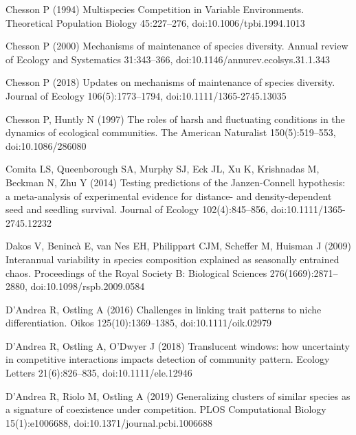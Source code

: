 \documentclass[a4paper,12pt]{article}
\begin{document}
\begin{thebibliography}{68}
Chesson P (1994) Multispecies {Competition} in {Variable} {Environments}.
  Theoretical Population Biology 45:227--276, doi:{10.1006/tpbi.1994.1013}

Chesson P (2000) Mechanisms of maintenance of species diversity. Annual review
  of Ecology and Systematics 31:343--366,
  doi:{10.1146/annurev.ecolsys.31.1.343}

Chesson P (2018) Updates on mechanisms of maintenance of species diversity.
  Journal of Ecology 106(5):1773--1794, doi:{10.1111/1365-2745.13035}

Chesson P, Huntly N (1997) The roles of harsh and fluctuating conditions in the
  dynamics of ecological communities. The American Naturalist 150(5):519--553,
  doi:{10.1086/286080}

Comita LS, Queenborough SA, Murphy SJ, Eck JL, Xu K, Krishnadas M, Beckman N,
  Zhu Y (2014) {Testing predictions of the Janzen-Connell hypothesis: a
  meta-analysis of experimental evidence for distance- and density-dependent
  seed and seedling survival}. Journal of Ecology 102(4):845--856,
  doi:{10.1111/1365-2745.12232}

Dakos V, Beninc\`{a} E, van Nes EH, Philippart CJM, Scheffer M, Huisman J
  (2009) Interannual variability in species composition explained as seasonally
  entrained chaos. Proceedings of the Royal Society B: Biological Sciences
  276(1669):2871--2880, doi:{10.1098/rspb.2009.0584}

D'Andrea R, Ostling A (2016) Challenges in linking trait patterns to niche
  differentiation. Oikos 125(10):1369--1385, doi:{10.1111/oik.02979}

D'Andrea R, Ostling A, O'Dwyer J (2018) Translucent windows: how uncertainty in
  competitive interactions impacts detection of community pattern. Ecology
  Letters 21(6):826--835, doi:{10.1111/ele.12946}

D'Andrea R, Riolo M, Ostling A (2019) Generalizing clusters of similar species
  as a signature of coexistence under competition. PLOS Computational Biology
  15(1):e1006688, doi:{10.1371/journal.pcbi.1006688}


\end{thebibliography}
\end{document}
